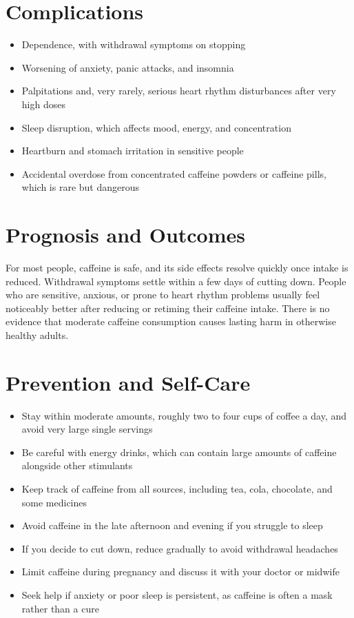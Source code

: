 \section*{Complications}
\begin{itemize}
    \item Dependence, with withdrawal symptoms on stopping
    \item Worsening of anxiety, panic attacks, and insomnia
    \item Palpitations and, very rarely, serious heart rhythm disturbances after very high doses
    \item Sleep disruption, which affects mood, energy, and concentration
    \item Heartburn and stomach irritation in sensitive people
    \item Accidental overdose from concentrated caffeine powders or caffeine pills, which is rare but dangerous
\end{itemize}

\section*{Prognosis and Outcomes}
For most people, caffeine is safe, and its side effects resolve quickly once intake is reduced. Withdrawal symptoms settle within a few days of cutting down. People who are sensitive, anxious, or prone to heart rhythm problems usually feel noticeably better after reducing or retiming their caffeine intake. There is no evidence that moderate caffeine consumption causes lasting harm in otherwise healthy adults.

\section*{Prevention and Self-Care}
\begin{itemize}
    \item Stay within moderate amounts, roughly two to four cups of coffee a day, and avoid very large single servings
    \item Be careful with energy drinks, which can contain large amounts of caffeine alongside other stimulants
    \item Keep track of caffeine from all sources, including tea, cola, chocolate, and some medicines
    \item Avoid caffeine in the late afternoon and evening if you struggle to sleep
    \item If you decide to cut down, reduce gradually to avoid withdrawal headaches
    \item Limit caffeine during pregnancy and discuss it with your doctor or midwife
    \item Seek help if anxiety or poor sleep is persistent, as caffeine is often a mask rather than a cure
\end{itemize}

